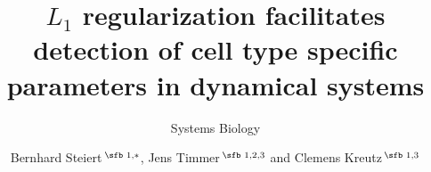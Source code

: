 \documentclass{bioinfo}
\newcommand{\boldm}[1] {\mathversion{bold}#1\mathversion{normal}}
\begin{document}

\subtitle{Systems Biology}

\title[$L_1$ regularization to detect differences between cell types]{{\boldm $L_1$} regularization facilitates detection of cell type specific parameters in dynamical systems}
\author[Steiert \textit{et~al}.]{Bernhard Steiert\,$^{\text{\sfb 1,}*}$, Jens Timmer\,$^{\text{\sfb 1,2,3}}$ and Clemens Kreutz\,$^{\text{\sfb 1,3}}$}
\address{$^{\text{\sf 1}}$Institute of Physics, University of Freiburg, Germany, \\
$^{\text{\sf 2}}$BIOSS Centre for Biological Signalling Studies, University of Freiburg, Germany, and \\
$^{\text{\sf 3}}$Freiburg Center for Systems Biology (ZBSA), University of Freiburg, Germany.}


\end{document}
